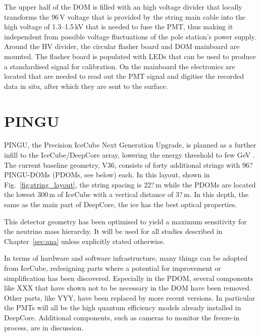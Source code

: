 The upper half of the DOM is filled with an high voltage divider that locally 
transforms the 96\,V voltage that is provided by the string main cable into the 
high voltage of 1.3--1.5\,kV that is needed to fuse the PMT, thus making it 
independent from possible voltage fluctuations of the pole station's power 
supply. Around the HV divider, the circular flasher board and DOM mainboard are 
mounted. The flasher board is populated with LEDs that can be used to produce a 
standardised signal for calibration. On the mainboard the electronics are 
located that are needed to read out the PMT signal and digitise the recorded 
data in situ, after which they are sent to the surface.



\section{PINGU}
\label{sec:PINGU}

PINGU, the Precision IceCube Next Generation Upgrade, is planned as a further 
infill to the IceCube/DeepCore array, lowering the energy threshold to few GeV 
\cite{LoI}. The current baseline geometry, V36, consists of forty additional 
strings with 96? PINGU-DOMs (PDOMs, see below) each. In this layout, shown in 
Fig.~\ref{fig:string_layout}, the string spacing is 22?\,m while the PDOMs are 
located the lowest 300\,m of IceCube with a vertical distance of 3?\,m. In this 
depth, the same as the main part of DeepCore, the ice has the best optical 
properties.

This detector geometry has been optimised to yield a maximum sensitivity for 
the neutrino mass hierarchy. It will be used for all studies described in 
Chapter~\ref{sec:ana} unless explicitly stated otherwise.

In terms of hardware and software infrastructure, many things can be adopted 
from IceCube, redesigning parts where a potential for improvement or 
simplification has been discovered. Especially in the PDOM, several components 
like XXX that have shown not to be necessary in the DOM have been removed. 
Other parts, like YYY, have been replaced by more recent versions. In 
particular the PMTs will all be the high quantum efficiency models already 
installed in DeepCore. Additional components, such as cameras to monitor the 
freeze-in process, are in discussion.

